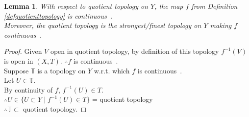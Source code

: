 \documentclass{article}
\newcommand{\cts}{continuous\ }
\newtheorem{slemma}[stheorem]{Lemma}
\theoremstyle{remark}
\theoremstyle{example}
\theoremstyle{examples}
\begin{document}
	\begin{slemma}
		With respect to quotient topology on $Y$, the map $f$ from Definition \ref{defquotienttopology} is \cts.\\
		Moreover, the quotient topology is the strongest/finest topology on $Y$ making $f$ \cts.
	\end{slemma}
	\begin{proof}
		Given $V$ open in quotient topology, by definition of this topology $f^{-1}(V)$ is open in $(X,T)$. $\therefore f$ is \cts.\\
		Suppose $\mathbb{T}$ is a topology on $Y$ w.r.t. which $f$ is \cts.\\
		Let $U \in \mathbb{T}$.\\
		By continuity of $f$, $f^{-1}(U) \in T$.\\
		$\therefore U \in \{U \subset Y \mid f^{-1}(U) \in T\}$ = quotient topology\\
		$\therefore \mathbb{T} \subset$ quotient topology.
	\end{proof}
\end{document}
